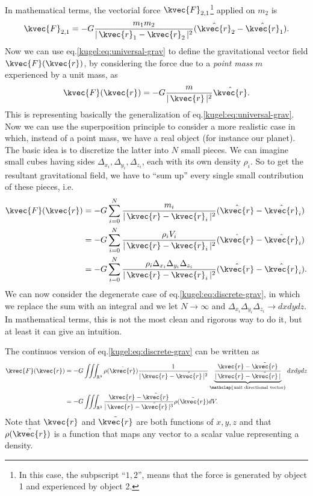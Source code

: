 In mathematical terms, the vectorial force $\kvec{F}_{2,1}$\footnote{In this case, the subpscript ``$1,2$'',  
means that the force is generated by object 1 and experienced by object 2.} applied on $m_2$ is
\begin{equation}
  \kvec{F}_{2,1} = -G\frac{m_1m_2}{|\, \kvec{r}_1 - \kvec{r}_2\,|^2} ( \hat{\kvec{r}}_2-\hat{\kvec{r}}_1 ).\label{kugel:eq:universal-grav}
\end{equation}
Now we can use eq.\eqref{kugel:eq:universal-grav} to define the gravitational vector field $\kvec{F}(\kvec{r})$,  by considering the force due to a \emph{point mass} $m$ experienced by a unit mass, as
\begin{equation}
  \kvec{F}(\kvec{r}) = -G\frac{m}{|\, \kvec{r} \,|^2}\hat{\kvec{r}}. \label{kugel:eq:grav-vec-field}
\end{equation}
This is representing basically the generalization of eq.\eqref{kugel:eq:universal-grav}.
Now we can use the superposition principle to consider a more realistic case in which, instead of a point mass, we have a real object (for instance our planet). 
The basic idea is to discretize the latter into $N$ small pieces. We can imagine small cubes having sides $\Delta_{x_i}, \Delta_{y_i}, \Delta_{z_i}$, 
each with its own density $\rho_i$. So to get the resultant gravitational field, we have to ``sum up'' every single small contribution of these pieces, i.e.
\begin{align}
  \kvec{F}(\kvec{r}) &= -G \sum_{i=0}^N \frac{m_i}{|\, \kvec{r}-\kvec{r}_i \,|^2}(\hat{\kvec{r}}-\hat{\kvec{r}}_i) \nonumber \\ 
                     &= -G \sum_{i=0}^N \frac{\rho_i V_i}{|\, \kvec{r}-\kvec{r}_i \,|^2}(\hat{\kvec{r}}-\hat{\kvec{r}}_i) \nonumber \\
                     &= -G \sum_{i=0}^N \frac{\rho_i \Delta_{x_i}\Delta_{y_i}\Delta_{z_i}}{|\, \kvec{r}-\kvec{r}_i \,|^2}(\hat{\kvec{r}}-\hat{\kvec{r}}_i). \label{kugel:eq:discrete-grav}
\end{align}
We can now consider the degenerate case of eq.\eqref{kugel:eq:discrete-grav}, in which we replace the sum with an integral and we let $N\to \infty$ and $\Delta_{x_i}\Delta_{y_i}\Delta_{z_i}\to dxdydz$.
In mathematical terms, this is not the most clean and rigorous way to do it, but at least it can give an intuition. 

The continuos version of eq.\eqref{kugel:eq:discrete-grav} can be written as
\begin{align*}
  \kvec{F}(\kvec{r}) &= -G \iiint_{\mathbb{R}^3} \rho(\tilde{\kvec{r}})\frac{1}{|\, \kvec{r}-\tilde{\kvec{r}} \,|^2}\underbrace{\frac{\kvec{r}-\tilde{\kvec{r}}}{|\, \kvec{r}-\tilde{\kvec{r}} \,|}}_{\mathclap{\text{unit directional vector}}}dxdydz \nonumber \\
                     &= -G \iiint_{\mathbb{R}^3}\frac{\kvec{r}-\tilde{\kvec{r}}}{|\, \kvec{r}-\tilde{\kvec{r}} \,|^3} \rho(\tilde{\kvec{r}})dV. \label{kugel:eq:continuos-grav} 
\end{align*}
Note that $\kvec{r}$ and $\tilde{\kvec{r}}$ are both functions of $x,y,z$ and that $\rho(\tilde{\kvec{r}})$ is a function that maps any vector to a scalar value representing a density.

